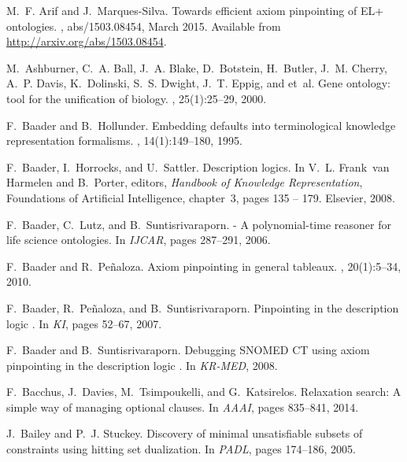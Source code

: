 \documentclass{llncs}
\begin{document}
\begin{thebibliography}{10}

M.~F. Arif and J.~Marques{-}Silva.
\newblock Towards efficient axiom pinpointing of {EL+} ontologies.
, abs/1503.08454, March 2015.
\newblock Available from \url{http://arxiv.org/abs/1503.08454}.

M.~Ashburner, C.~A. Ball, J.~A. Blake, D.~Botstein, H.~Butler, J.~M. Cherry,
  A.~P. Davis, K.~Dolinski, S.~S. Dwight, J.~T. Eppig, and et~al.
\newblock Gene ontology: tool for the unification of biology.
, 25(1):25--29, 2000.

F.~Baader and B.~Hollunder.
\newblock Embedding defaults into terminological knowledge representation
  formalisms.
, 14(1):149--180, 1995.

F.~Baader, I.~Horrocks, and U.~Sattler.
\newblock Description logics.
\newblock In V.~L. Frank~van Harmelen and B.~Porter, editors, {\em Handbook of
  Knowledge Representation}, Foundations of Artificial Intelligence, chapter~3,
  pages 135 -- 179. Elsevier, 2008.

F.~Baader, C.~Lutz, and B.~Suntisrivaraporn.
 - {A} polynomial-time reasoner for life science ontologies.
\newblock In {\em IJCAR}, pages 287--291, 2006.

F.~Baader and R.~Pe{\~{n}}aloza.
\newblock Axiom pinpointing in general tableaux.
, 20(1):5--34, 2010.

F.~Baader, R.~Pe{\~{n}}aloza, and B.~Suntisrivaraporn.
\newblock Pinpointing in the description logic .
\newblock In {\em KI}, pages 52--67, 2007.

F.~Baader and B.~Suntisrivaraporn.
\newblock Debugging {SNOMED} {CT} using axiom pinpointing in the description
  logic .
\newblock In {\em KR-MED}, 2008.

F.~Bacchus, J.~Davies, M.~Tsimpoukelli, and G.~Katsirelos.
\newblock Relaxation search: {A} simple way of managing optional clauses.
\newblock In {\em AAAI}, pages 835--841, 2014.

J.~Bailey and P.~J. Stuckey.
\newblock Discovery of minimal unsatisfiable subsets of constraints using
  hitting set dualization.
\newblock In {\em PADL}, pages 174--186, 2005.


\end{thebibliography}
\end{document}
